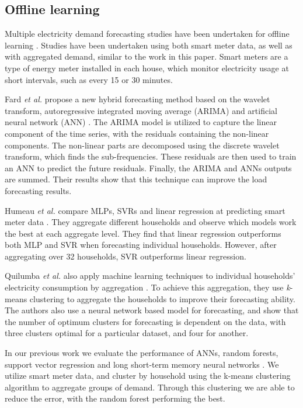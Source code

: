 \documentclass[final,3p,times,twocolumn,numbers]{elsarticle}
\begin{document}
\subsection{Offline learning}

Multiple electricity demand forecasting studies have been undertaken for offline learning \cite{Chen2004, Gross1987, Ghofrani}. Studies have been undertaken using both smart meter data, as well as with aggregated demand, similar to the work in this paper. Smart meters are a type of energy meter installed in each house, which monitor electricity usage at short intervals, such as every 15 or 30 minutes.


Fard \textit{et al.} propose a new hybrid forecasting method based on the wavelet transform, autoregressive integrated moving average (ARIMA) and artificial neural network (ANN) \cite{Fard2014}. The ARIMA model is utilized to capture the linear component of the time series, with the residuals containing the non-linear components. The non-linear parts are decomposed using the discrete wavelet transform, which finds the sub-frequencies. These residuals are then used to train an ANN  to predict the future residuals. Finally, the ARIMA and ANNs outputs are summed. Their results show that this technique can improve the load forecasting results.    

Humeau \textit{et al.} compare MLPs, SVRs and linear regression at predicting smart meter data \cite{Humeau2013}. They aggregate different households and observe which models work the best at each aggregate level. They find that linear regression outperforms both MLP and SVR when forecasting individual households. However, after aggregating over 32 households, SVR outperforms linear regression.


Quilumba \textit{et al.} also apply machine learning techniques to individual households' electricity consumption by aggregation \cite{Fard2014}. To achieve this aggregation, they use \textit{k}-means clustering to aggregate the households to improve their forecasting ability. The authors also use a neural network based model for forecasting, and show that the number of optimum clusters for forecasting is dependent on the data, with three clusters optimal for a particular dataset, and four for another.

In our previous work we evaluate the performance of ANNs, random forests, support vector regression and long short-term memory neural networks \cite{Kell2018a}. We utilize smart meter data, and cluster by household using the k-means clustering algorithm to aggregate groups of demand. Through this clustering we are able to reduce the error, with the random forest performing the best.
\end{document}
